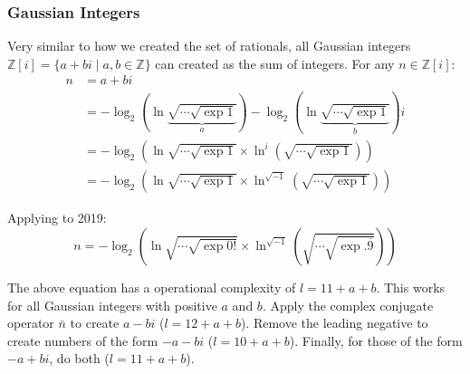 \subsubsection{Gaussian Integers}
Very similar to how we created the set of rationals, all Gaussian integers $\mathbb{Z}[i]=\{a+bi\mid a,b\in\mathbb{Z}\}$ can created as the sum of integers. For any $n\in\mathbb{Z}[i]$:
\begin{align*}
  n &= a + bi \\
  &= -\log_2\left(
      \ln \underbrace{\sqrt{\cdots\sqrt{\exp1}}}_{a} 
    \right) -
    \log_2\left(
      \ln \underbrace{\sqrt{\cdots\sqrt{\exp1}}}_{b} 
    \right)i \\
  &= -\log_2\left(
      \ln \sqrt{\cdots\sqrt{\exp1}}
      \times
      \ln^i \left(\sqrt{\cdots\sqrt{\exp1}}\right)
    \right) \\
  &= -\log_2\left(
      \ln \sqrt{\cdots\sqrt{\exp1}}
      \times
      \ln^{\sqrt{-1}} \left(\sqrt{\cdots\sqrt{\exp1}}\right)
    \right)
\end{align*}

Applying to 2019:
\begin{equation}
  n = -\log_2\left(
    \ln \sqrt{\cdots\sqrt{\exp0!}}
    \times
    \ln^{\sqrt{-1}} \left(
      \sqrt{\cdots\sqrt{\exp .\overline{9}}}
    \right)
  \right)
\end{equation}

The above equation has a operational complexity of $l=11+a+b$.
This works for all Gaussian integers with positive $a$ and $b$.
Apply the complex conjugate operator $\bar{n}$ to create $a-bi$ ($l=12+a+b$).
Remove the leading negative to create numbers of the form $-a-bi$ ($l=10+a+b$).
Finally, for those of the form $-a+bi$, do both ($l=11+a+b$).

